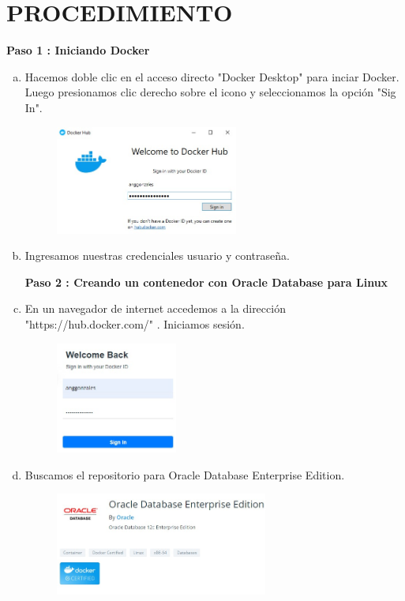 \documentclass[preprint,12pt]{elsarticle}
\begin{document}
\section{PROCEDIMIENTO}
\textbf{Paso 1 : Iniciando Docker}
\begin{enumerate}[a)]
\item Hacemos doble clic en el acceso directo "Docker Desktop" para inciar Docker. Luego presionamos clic derecho sobre el icono y seleccionamos la opción "Sig In".
\begin{figure}[htb]
	\begin{center}
		\includegraphics[width=6cm]{./IMAGENES/Docker01}
	\end{center}
\end{figure}
\item Ingresamos nuestras credenciales usuario  y contraseña.

\textbf{Paso 2 : Creando un contenedor con Oracle Database para Linux}
\item En un navegador de internet accedemos a la dirección "https://hub.docker.com/" .\newline 
Iniciamos sesión.
\begin{figure}[htb]
	\begin{center}
		\includegraphics[width=4cm]{./IMAGENES/Docker8_01}
	\end{center}
\end{figure}

\item Buscamos el repositorio para Oracle Database Enterprise Edition.
\begin{figure}[htb]
	\begin{center}
		\includegraphics[width=7cm]{./IMAGENES/Docker8_02}
	\end{center}
\end{figure}


\end{enumerate}
\end{document}
